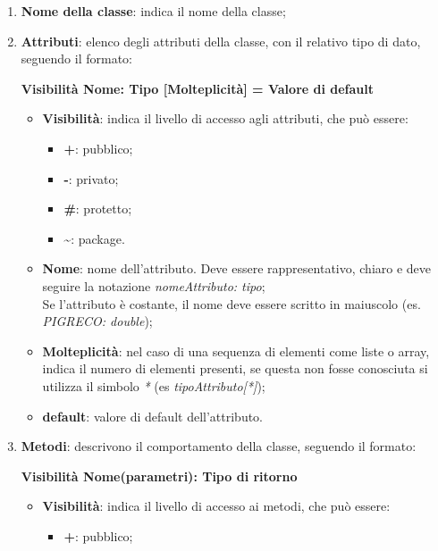 \begin{enumerate}
	\item \textbf{Nome della classe}: indica il nome della classe;
	\item \textbf{Attributi}: elenco degli attributi della classe, con il relativo tipo di dato, seguendo il formato: 
	\begin{center}
		\textbf{Visibilità Nome: Tipo [Molteplicità] = Valore di default}\end{center}
	      \begin{itemize}
		      \item \textbf{Visibilità}: indica il livello di accesso agli attributi, che può essere:
		            \begin{itemize}
			            \item \textbf{+}: pubblico;
			            \item \textbf{-}: privato;
			            \item \textbf{\#}: protetto;
			            \item \textbf{\textasciitilde}: package.
		            \end{itemize}
		      \item \textbf{Nome}: nome dell'attributo. Deve essere rappresentativo, chiaro e deve seguire la notazione \textit{nomeAttributo: tipo}; \\ Se l'attributo è costante, il nome deve essere scritto in maiuscolo (es. \textit{PIGRECO: double});
		      \item \textbf{Molteplicità}: nel caso di una sequenza di elementi come liste o array, indica il numero di elementi presenti, se questa non fosse conosciuta si utilizza il simbolo \textit{*} (es \textit{tipoAttributo[*]});
		      \item \textbf{default}: valore di default dell'attributo.
	      \end{itemize}
	\item \textbf{Metodi}: descrivono il comportamento della classe, seguendo il formato: \\ \begin{center}\textbf{Visibilità Nome(parametri): Tipo di ritorno}\end{center}
	      \begin{itemize}
		      \item \textbf{Visibilità}: indica il livello di accesso ai metodi, che può essere:
		            \begin{itemize}
			            \item \textbf{+}: pubblico;

\end{itemize}
\end{itemize}
\end{enumerate}
